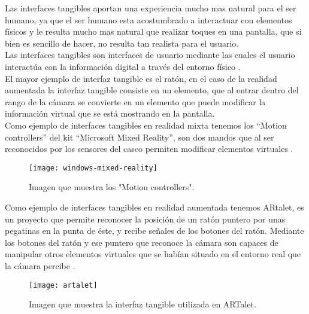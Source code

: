 Las interfaces tangibles aportan una experiencia mucho mas natural para el ser humano, ya que el ser humano esta acostumbrado a interactuar con elementos físicos y le resulta mucho mas natural que realizar toques en una pantalla, que si bien es sencillo de hacer, no resulta tan realista para el usuario.\\

Las interfaces tangibles son interfaces de usuario mediante las cuales el usuario interactúa con la información digital a través del entorno físico \cite{ullmer}.\\

El mayor ejemplo de interfaz tangible es el ratón, en el caso de la realidad aumentada la interfaz tangible consiste en un elemento, que al entrar dentro del rango de la cámara se convierte en un elemento que puede modificar la información virtual que se está mostrando en la pantalla.\\

Como ejemplo de interfaces tangibles en realidad mixta tenemos los “Motion controllers” del kit “Microsoft Mixed Reality”, son dos mandos que al ser reconocidos por los sensores del casco permiten modificar elementos virtuales \cite{windows-mixed-reality}.\\

\begin{figure}[h]
  \centering
  \texttt{[image: windows-mixed-reality]}
  \caption{Imagen que muestra los "Motion controllers".\protect\footnotemark}
  \label{figura-windowsmixedreality}
\end{figure}



Como ejemplo de interfaces tangibles en realidad aumentada tenemos ARtalet, es un proyecto que permite reconocer la posición de un ratón puntero por unas pegatinas en la punta de éste, y recibe señales de los botones del ratón. Mediante los botones del ratón y ese puntero que reconoce la cámara son capaces de manipular otros elementos virtuales que se habían situado en el entorno real que la cámara percibe \cite{ha}.\\

\begin{figure}[h]
  \centering
  \texttt{[image: artalet]}
  \caption{Imagen que muestra la interfaz tangible utilizada en ARTalet.\protect\footnotemark}
  \label{figura-artalet}
\end{figure}

